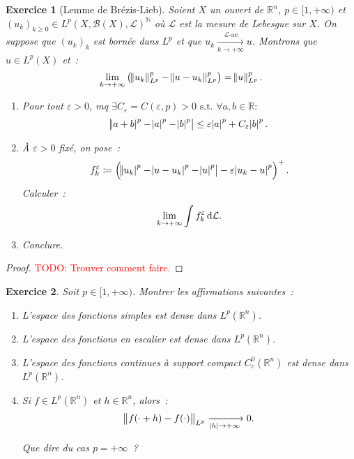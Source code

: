 \documentclass{article}
\newtheorem{ex}{Exercice}[section]
\theoremstyle{definition}
\newcommand{\TODO}[1]{\textcolor{red}{TODO: #1}}
\newcommand{\pinfty}{{+\infty}}
\newcommand{\st}{\text{ s.t. }}
\newcommand{\N}{{\mathbb N}}
\newcommand{\R}{{\mathbb R}}
\begin{document}
\begin{ex}[Lemme de Brézis-Lieb] Soient $X$ un ouvert de $\R^n$, $p \in [1, \pinfty)$ et $(u_k)_{k \geq 0} \in {L^p(X, \mathcal B(X), \mathcal L)}^\N$ où $\mathcal L$
est la mesure de Lebesgue sur $X$. On suppose que $(u_k)_k$ est bornée dans $L^p$ et que $u_k \xrightarrow[k \to \pinfty]{\mathcal L\text{-ae}} u$.
Montrons que $u \in L^p(X)$ et~:
\[\lim_{k \to \pinfty}\left(\norm {u_k}_{L^p}^p - \norm {u-u_k}_{L^p}^p\right) = \norm u_{L^p}^p.\]

\begin{enumerate}
	\item Pour tout $\varepsilon > 0$, mq $\exists C_\varepsilon = C(\varepsilon, p) > 0 \st \forall a, b \in \R :$
	\[\abs {\abs {a+b}^p - \abs a^p - \abs b^p} \leq \varepsilon\abs a^p + C_\varepsilon\abs b^p.\]

	\item À $\varepsilon > 0$ fixé, on pose~:
	\[f_k^\varepsilon \coloneqq \left(\abs {\abs {u_k}^p - \abs {u-u_k}^p - \abs u^p} - \varepsilon\abs {u_k-u}^p\right)^+.\]
	Calculer~:
	\[\lim_{k \to \pinfty}\int f_k^\varepsilon\dif\mathcal L.\]

	\item Conclure.
\end{enumerate}
\end{ex}

\begin{proof}
	\TODO{Trouver comment faire.}
\end{proof}

\begin{ex} Soit $p \in [1, \pinfty)$. Montrer les affirmations suivantes~:
\begin{enumerate}
	\item L'espace des fonctions simples est dense dans $L^p(\R^n)$.
	\item L'espace des fonctions en escalier est dense dans $L^p(\R^n)$.
	\item L'espace des fonctions continues à support compact $C^0_c(\R^n)$ est dense dans $L^p(\R^n)$.
	\item Si $f \in L^p(\R^n)$ et $h \in \R^n$, alors~:
	\[\norm {f(\cdot+h)-f(\cdot)}_{L^p} \xrightarrow[\abs h \to \pinfty]{} 0.\]

	Que dire du cas $p = \pinfty$~?
\end{enumerate}
\end{ex}
\end{document}
